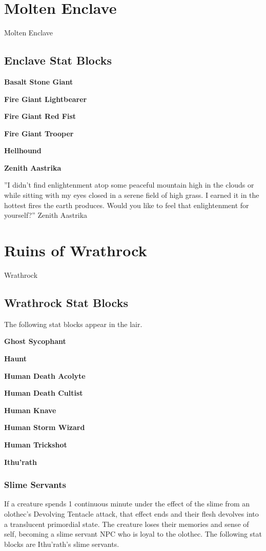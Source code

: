 \documentclass[10pt,a4paper,twoside,bg=print,twocolumn,openany,nodeprecatedcode]{dndbook}
\begin{document}
\chapter{Molten Enclave}
Molten Enclave

\section{Enclave Stat Blocks}
\textbf{Basalt Stone Giant}

\textbf{Fire Giant Lightbearer}

\textbf{Fire Giant Red Fist}

\textbf{Fire Giant Trooper}

\textbf{Hellhound}

\textbf{Zenith Aastrika}

\DndQuote%
{}
{''I didn't find enlightenment atop some peaceful mountain high in the clouds or while sitting with my eyes closed in a serene field of high grass. I earned it in the hottest fires the earth produces. Would you like to feel that enlightenment for yourself?''}
{Zenith Aastrika}
\chapter{Ruins of Wrathrock}
Wrathrock

\section{Wrathrock Stat Blocks}
The following stat blocks appear in the lair.

\textbf{Ghost Sycophant}

\textbf{Haunt}

\textbf{Human Death Acolyte}

\textbf{Human Death Cultist}

\textbf{Human Knave}

\textbf{Human Storm Wizard}

\textbf{Human Trickshot}

\textbf{Ithu'rath}

\subsection{Slime Servants}
If a creature spends 1 continuous minute under the effect of the slime from an olothec's Devolving Tentacle attack, that effect ends and their flesh devolves into a translucent primordial state. The creature loses their memories and sense of self, becoming a slime servant NPC who is loyal to the olothec. The following stat blocks are Ithu'rath's slime servants.
\end{document}

